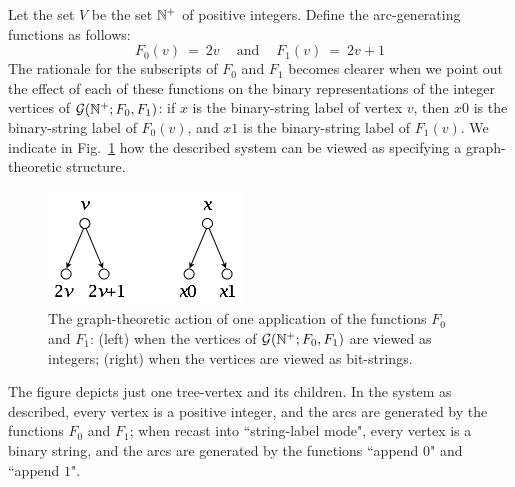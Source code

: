 Let the set $V$ be the set $\mathbb{N}^+$ of positive integers.  Define the arc-generating functions as follows:
\[ F_0(v) \ = \ 2v \ \ \ \ \mbox{ and } \ \ \ \ F_1(v) \ = \ 2v+1 \]
The rationale for the subscripts of $F_0$ and $F_1$ becomes clearer when we point out the effect of each of these functions on the binary representations of the integer vertices of
$\mbox{$\cal G$}(\mathbb{N}^+; F_0, F_1)$: if $x$ is the binary-string label of vertex $v$, then $x0$ is the binary-string label of $F_0(v)$, and $x1$ is the binary-string label of $F_1(v)$.  We indicate in Fig.~\ref{fig:one-node-tree} how the described system can be viewed as specifying a graph-theoretic structure.
\begin{figure}[hbt]
\begin{center}
       \includegraphics[scale=0.5]{FiguresGraph/codingTree1}
\caption{The graph-theoretic action of one application of the functions $F_0$ and $F_1$:
(left) when the vertices of $\mbox{$\cal G$}(\mathbb{N}^+; F_0, F_1)$ are viewed as integers; (right) when the vertices
are viewed as bit-strings.}  
\label{fig:one-node-tree}
\end{center}
\end{figure}
The figure depicts just one tree-vertex and its children.  In the system as described, every vertex is a positive integer, and the arcs are generated by the functions $F_0$ and $F_1$; when recast into ``string-label mode", every vertex is a binary string, and the arcs are generated by the functions ``append $0$" and ``append $1$".

\bigskip

